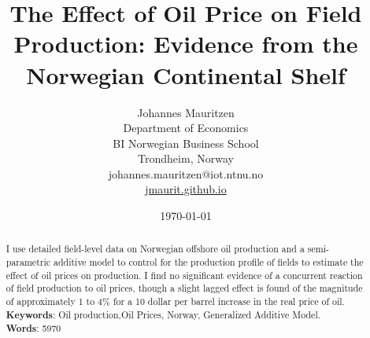 \documentclass[12pt]{article}
\title{The Effect of Oil Price on Field Production: Evidence from the Norwegian Continental Shelf}
\author{Johannes Mauritzen\\
		Department of Economics\\
        BI Norwegian Business School\\
        Trondheim, Norway\\
        johannes.mauritzen@iot.ntnu.no\\
        \url{jmaurit.github.io}\\
		}
\date{\today}
\begin{document}
	\maketitle

\begin{abstract}
I use detailed field-level data on Norwegian offshore oil production and a semi-parametric additive model to control for the production profile of fields to estimate the effect of oil prices on production.  I find no significant evidence of a concurrent reaction of field production to oil prices, though a slight lagged effect is found of the magnitude of approximately 1 to 4\% for a 10 dollar per barrel increase in the real price of oil.\\
\textbf{Keywords}: Oil production,Oil Prices, Norway, Generalized Additive Model.\\
\textbf{Words}: 5970
\end{abstract}
\end{document}
